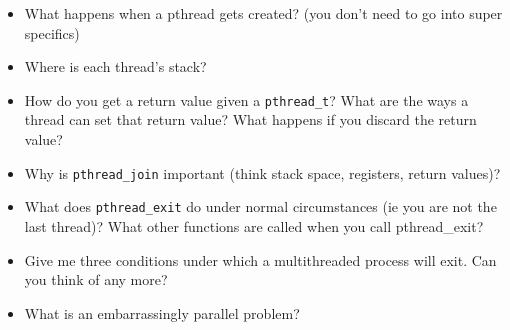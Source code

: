 \begin{itemize}
\tightlist
\item
  What happens when a pthread gets created? (you don't need to go into
  super specifics)
\item
  Where is each thread's stack?
\item
  How do you get a return value given a \texttt{pthread\_t}? What are
  the ways a thread can set that return value? What happens if you
  discard the return value?
\item
  Why is \texttt{pthread\_join} important (think stack space, registers,
  return values)?
\item
  What does \texttt{pthread\_exit} do under normal circumstances (ie you
  are not the last thread)? What other functions are called when you
  call pthread\_exit?
\item
  Give me three conditions under which a multithreaded process will
  exit. Can you think of any more?
\item
  What is an embarrassingly parallel problem?
\end{itemize}
